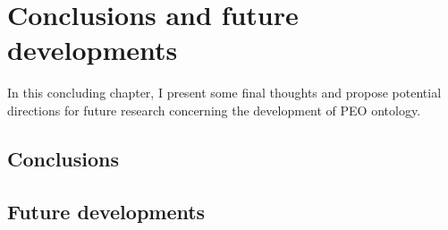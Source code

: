 \chapter{Conclusions and future developments}
In this concluding chapter, I present some final thoughts and propose potential directions for future research concerning the development of PEO ontology.
\section{Conclusions}

\section{Future developments}

